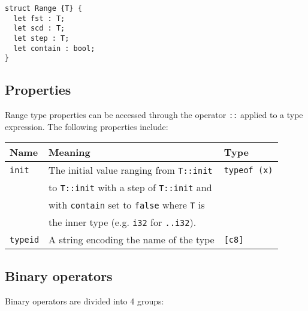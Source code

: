 \begin{lstlisting}[style=coloredverbatim]
struct Range {T} {
  let fst : T;
  let scd : T;
  let step : T;
  let contain : bool;
}
\end{lstlisting}

\subsection {Properties}

Range type properties can be accessed through the operator \texttt{::} applied
to a type expression. The following properties include:

\begin{center}\begin{adjustbox}{max width=\linewidth}
  \begin{tabular}{|l|ll|}
    \hline
    Name & Meaning & Type\\
    \hline
    \hline
    \texttt{init} & The initial value ranging from \texttt{T::init} & \texttt{typeof (x)}\\
    & to \texttt{T::init} with a step of \texttt{T::init} and & \\
    & with \texttt{contain} set to \texttt{false} where \texttt{T} is & \\
    & the inner type (e.g. \texttt{i32} for \texttt{..i32}). &\\
    \hline
    \texttt{typeid} & A string encoding the name of the type & \texttt{[c8]} \\
    \hline
  \end{tabular}
\end{adjustbox}\end{center}


\subsection {Binary operators}

Binary operators are divided into 4 groups:

